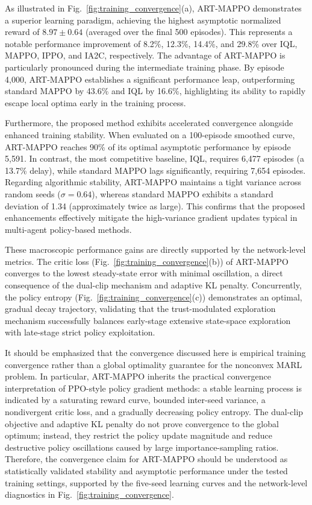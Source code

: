 \documentclass[lettersize,journal]{IEEEtran}
\begin{document}
As illustrated in Fig.~\ref{fig:training_convergence}(a), ART-MAPPO demonstrates a superior learning paradigm, achieving the highest asymptotic normalized reward of $8.97 \pm 0.64$ (averaged over the final 500 episodes). This represents a notable performance improvement of 8.2\%, 12.3\%, 14.4\%, and 29.8\% over IQL, MAPPO, IPPO, and IA2C, respectively. The advantage of ART-MAPPO is particularly pronounced during the intermediate training phase. By episode 4,000, ART-MAPPO establishes a significant performance leap, outperforming standard MAPPO by 43.6\% and IQL by 16.6\%, highlighting its ability to rapidly escape local optima early in the training process.

Furthermore, the proposed method exhibits accelerated convergence alongside enhanced training stability. When evaluated on a 100-episode smoothed curve, ART-MAPPO reaches 90\% of its optimal asymptotic performance by episode 5,591. In contrast, the most competitive baseline, IQL, requires 6,477 episodes (a 13.7\% delay), while standard MAPPO lags significantly, requiring 7,654 episodes. Regarding algorithmic stability, ART-MAPPO maintains a tight variance across random seeds ($\sigma = 0.64$), whereas standard MAPPO exhibits a standard deviation of 1.34 (approximately twice as large). This confirms that the proposed enhancements effectively mitigate the high-variance gradient updates typical in multi-agent policy-based methods.

These macroscopic performance gains are directly supported by the network-level metrics. The critic loss (Fig.~\ref{fig:training_convergence}(b)) of ART-MAPPO converges to the lowest steady-state error with minimal oscillation, a direct consequence of the dual-clip mechanism and adaptive KL penalty. Concurrently, the policy entropy (Fig.~\ref{fig:training_convergence}(c)) demonstrates an optimal, gradual decay trajectory, validating that the trust-modulated exploration mechanism successfully balances early-stage extensive state-space exploration with late-stage strict policy exploitation.

It should be emphasized that the convergence discussed here is empirical training
convergence rather than a global optimality guarantee for the nonconvex MARL problem. In
particular, ART-MAPPO inherits the practical convergence interpretation of PPO-style policy
gradient methods: a stable learning process is indicated by a saturating reward curve, bounded
inter-seed variance, a nondivergent critic loss, and a gradually decreasing policy entropy.
The dual-clip objective and adaptive KL penalty do not prove convergence to the global
optimum; instead, they restrict the policy update magnitude and reduce destructive policy
oscillations caused by large importance-sampling ratios. Therefore, the convergence claim for
ART-MAPPO should be understood as statistically validated stability and asymptotic performance
under the tested training settings, supported by the five-seed learning curves and the
network-level diagnostics in Fig.~\ref{fig:training_convergence}.
\end{document}
